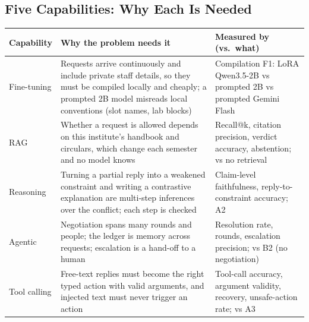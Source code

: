 \documentclass[11pt,a4paper]{article}
\begin{document}
\subsection{Five Capabilities: Why Each Is Needed}
\begin{table}[H]
\centering\small
\begin{tabularx}{\textwidth}{@{}L{1.75cm} Y L{5.1cm}@{}}
\toprule
\textbf{Capability} & \textbf{Why the problem needs it} & \textbf{Measured by (vs.\ what)}\\
\midrule
Fine-tuning & Requests arrive continuously and include private staff details, so they must be compiled locally and cheaply; a prompted 2B model misreads local conventions (slot names, lab blocks) & Compilation F1: LoRA Qwen3.5-2B vs prompted 2B vs prompted Gemini Flash\\
RAG & Whether a request is allowed depends on this institute's handbook and circulars, which change each semester and no model knows & Recall@k, citation precision, verdict accuracy, abstention; vs no retrieval\\
Reasoning & Turning a partial reply into a weakened constraint and writing a contrastive explanation are multi-step inferences over the conflict; each step is checked & Claim-level faithfulness, reply-to-constraint accuracy; A2\\
Agentic & Negotiation spans many rounds and people; the ledger is memory across requests; escalation is a hand-off to a human & Resolution rate, rounds, escalation precision; vs B2 (no negotiation)\\
Tool calling & Free-text replies must become the right typed action with valid arguments, and injected text must never trigger an action & Tool-call accuracy, argument validity, recovery, unsafe-action rate; vs A3\\
\bottomrule
\end{tabularx}
\end{table}
\end{document}
